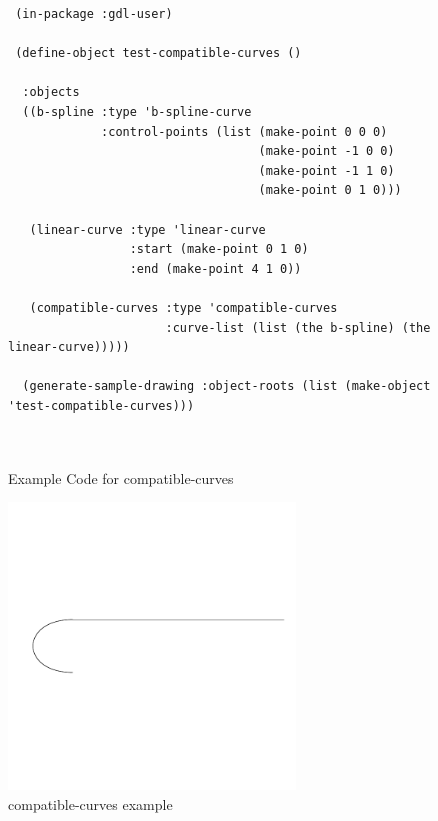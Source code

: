 \documentclass [11pt]{book}
\begin{document}
\begin{itemize}
\begin{figure}
\begin{lrbox}{\boxedverb}
\begin{minipage}{\linewidth}
{\begin{verbatim}
 (in-package :gdl-user)

 (define-object test-compatible-curves ()
  
  :objects
  ((b-spline :type 'b-spline-curve
             :control-points (list (make-point 0 0 0)
                                   (make-point -1 0 0)
                                   (make-point -1 1 0)
                                   (make-point 0 1 0)))
   
   (linear-curve :type 'linear-curve
                 :start (make-point 0 1 0)
                 :end (make-point 4 1 0))
   
   (compatible-curves :type 'compatible-curves
                      :curve-list (list (the b-spline) (the linear-curve)))))

  (generate-sample-drawing :object-roots (list (make-object 'test-compatible-curves)))



\end{verbatim}}
\end{minipage}
\end{lrbox}
\fbox{\usebox{\boxedverb}}

\caption{Example Code for compatible-curves}

\label{fig:example-code-compatible-curves}

\end{figure}

\begin{figure}
\begin{center}
\includegraphics[width=3in,height=3in]{../images/example-compatible-curves.pdf}
\end{center}

\caption{compatible-curves example}

\label{fig:compatible-curves}


\end{figure}
\end{itemize}
\end{document}
